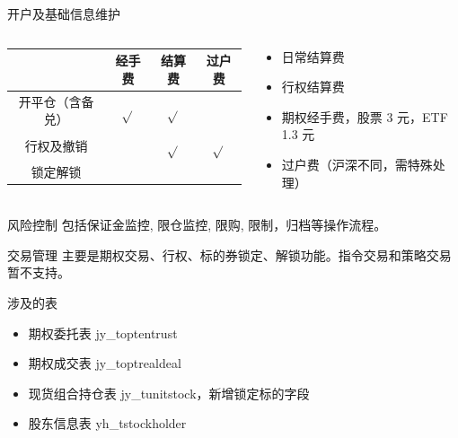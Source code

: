 \documentclass[12pt]{ctexbeamer}	%
\begin{document}
\begin{frame}{开户及基础信息维护}
  \begin{columns}
    \begin{column}{0.70\textwidth}
      \begin{tabular}{ c | c | c | c }
        \hline
         & 经手费 & 结算费 & 过户费 \\
        \hline
        开平仓（含备兑） & $\sqrt{}$ & $\sqrt{}$ &  \\
        \hline
        行权及撤销 &  & $\sqrt{}$ & $\sqrt{}$ \\
        \hline
        锁定解锁 & & & \\
        \hline
      \end{tabular}
    \end{column}
    \begin{column}{0.30\textwidth}
      \begin{itemize}
        \item 日常结算费
        \item 行权结算费
        \item 期权经手费，股票 3 元，ETF 1.3 元
        \item 过户费（沪深不同，需特殊处理）
      \end{itemize}
    \end{column}
  \end{columns}
\end{frame}

\begin{frame}{风险控制}
  包括保证金监控, 限仓监控, 限购, 限制，归档等操作流程。
\end{frame}

\begin{frame}{交易管理}
  主要是期权交易、行权、标的券锁定、解锁功能。指令交易和策略交易暂不支持。
  \begin{block}{涉及的表}
    \begin{itemize}
      \item 期权委托表 jy\_toptentrust
      \item 期权成交表 jy\_toptrealdeal
      \item 现货组合持仓表 jy\_tunitstock，新增锁定标的字段
      \item 股东信息表 yh\_tstockholder
    \end{itemize}
  \end{block}
\end{frame}
\end{document}

